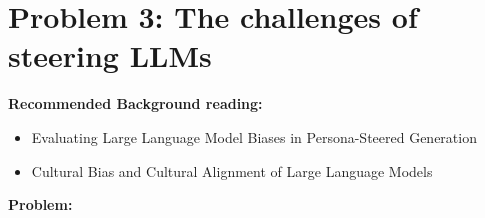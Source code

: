 \documentclass{article}
\begin{document}
\begin{enumerate}[label=(\alph*)]
        
        
        
\end{enumerate}








\newpage

\section*{Problem 3: The challenges of steering LLMs}


\textbf{Recommended Background reading:}
\begin{itemize}
    \item Evaluating Large Language Model Biases in Persona-Steered Generation  \citep{liu2024evaluating}
    \item Cultural Bias and Cultural Alignment of Large Language Models \citep{tao2024cultural}
\end{itemize}


\textbf{Problem:}
\end{document}

